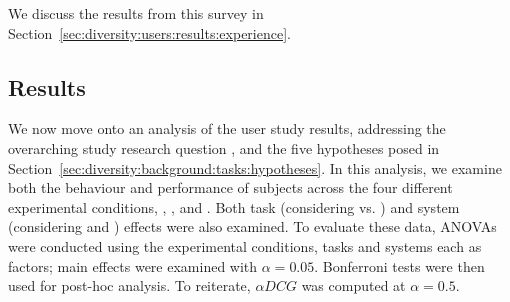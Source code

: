 We discuss the results from this survey in Section~\ref{sec:diversity:users:results:experience}.

\subsection{Results}
\vspace*{-4mm}
We now move onto an analysis of the user study results, addressing the overarching study research question , and the five hypotheses posed in Section~\ref{sec:diversity:background:tasks:hypotheses}. In this analysis, we examine both the behaviour and performance of subjects across the four different experimental conditions, , ,  and . Both task (considering  vs. ) and system (considering  and ) effects were also examined. To evaluate these data, ANOVAs were conducted using the experimental conditions, tasks and systems each as factors; main effects were examined with $\alpha=0.05$. Bonferroni tests were then used for post-hoc analysis. To reiterate, $\alpha DCG$ was computed at $\alpha=0.5$.

